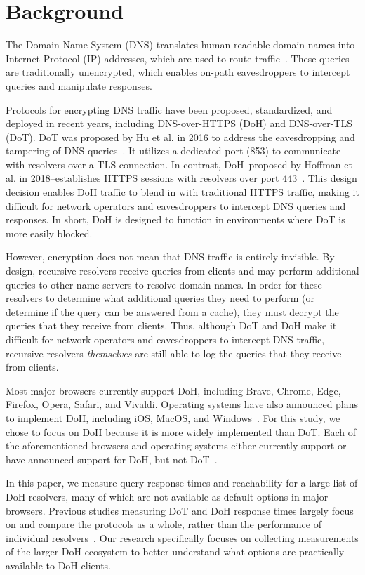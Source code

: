 \section{Background}\label{sec:back}
The Domain Name System (DNS) translates human-readable domain names into Internet Protocol (IP) addresses, which are used to route traffic~\cite{dns-rfcs}.
These queries are traditionally unencrypted, which enables on-path eavesdroppers to intercept queries and manipulate responses.

Protocols for encrypting DNS traffic have been proposed, standardized, and deployed in recent years, including DNS-over-HTTPS (DoH) and DNS-over-TLS (DoT).
DoT was proposed by Hu et al. in 2016 to address the eavesdropping and tampering of DNS queries~\cite{8}.
It utilizes a dedicated port (853) to communicate with resolvers over a TLS connection.
In contrast, DoH--proposed by Hoffman et al. in 2018--establishes HTTPS sessions with resolvers over port 443~\cite{7}.
This design decision enables DoH traffic to blend in with traditional HTTPS traffic, making it difficult for network operators and eavesdroppers to intercept DNS queries and responses.
In short, DoH is designed to function in environments where DoT is more easily blocked.

However, encryption does not mean that DNS traffic is entirely invisible.
By design, recursive resolvers receive queries from clients and may perform additional queries to other name servers to resolve domain names.
In order for these resolvers to determine what additional queries they need to perform (or determine if the query can be answered from a cache), they must decrypt the queries that they receive from clients.
Thus, although DoT and DoH make it difficult for network operators and eavesdroppers to intercept DNS traffic, recursive resolvers \emph{themselves} are still able to log the queries that they receive from clients.

Most major browsers currently support DoH, including Brave, Chrome, Edge, Firefox, Opera, Safari, and Vivaldi.
Operating systems have also announced plans to implement DoH, including iOS, MacOS, and Windows~\cite{16,17,18,19,20,21,22}.
For this study, we chose to focus on DoH because it is more widely implemented than DoT.
Each of the aforementioned browsers and operating systems either currently support or have announced support for DoH, but not DoT~\cite{lack-of-dot-support}.

In this paper, we measure query response times and reachability for a large list of DoH resolvers, many of which are not available as default options in major browsers.
Previous studies measuring DoT and DoH response times largely focus on and compare the protocols as a whole, rather than the performance of individual resolvers~\cite{14}.
Our research specifically focuses on collecting measurements of the larger DoH ecosystem to better understand what options are practically available to DoH clients.

